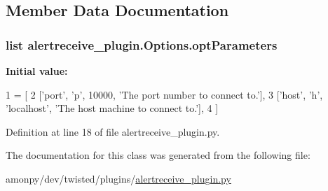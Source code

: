 \subsection{Member Data Documentation}
\hypertarget{classalertreceive__plugin_1_1_options_a33de9f8dfdb7c8e7c1963b16b630eea1}{
\subsubsection[{opt\-Parameters}]{\setlength{\rightskip}{0pt plus 5cm}list alertreceive\-\_\-plugin.\-Options.\-opt\-Parameters\hspace{0.3cm}{\ttfamily [static]}}}\label{classalertreceive__plugin_1_1_options_a33de9f8dfdb7c8e7c1963b16b630eea1}
{\bfseries Initial value\-:}
\begin{DoxyCode}
1 = [
2         [\textcolor{stringliteral}{'port'}, \textcolor{stringliteral}{'p'}, 10000, \textcolor{stringliteral}{'The port number to connect to.'}],
3         [\textcolor{stringliteral}{'host'}, \textcolor{stringliteral}{'h'}, \textcolor{stringliteral}{'localhost'}, \textcolor{stringliteral}{'The host machine to connect to.'}],
4         ]
\end{DoxyCode}


Definition at line 18 of file alertreceive\-\_\-plugin.\-py.



The documentation for this class was generated from the following file\-:\begin{DoxyCompactItemize}
\item 
amonpy/dev/twisted/plugins/\hyperlink{alertreceive__plugin_8py}{alertreceive\-\_\-plugin.\-py}\end{DoxyCompactItemize}
